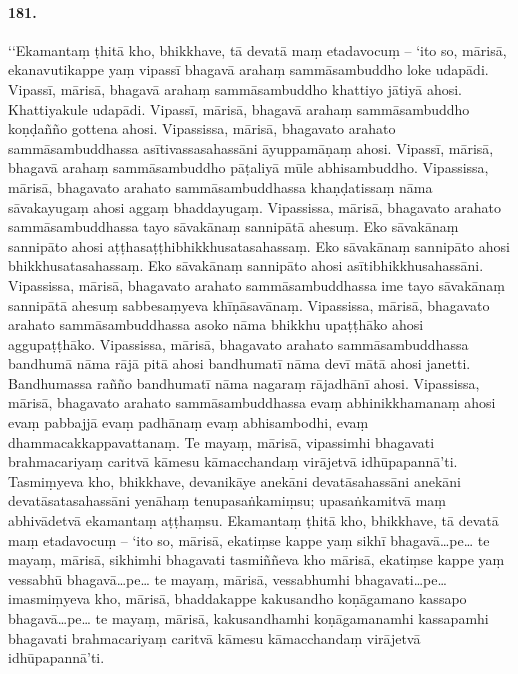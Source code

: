 \paragraph{181.} ‘‘Ekamantaṃ ṭhitā kho, bhikkhave, tā devatā maṃ etadavocuṃ – ‘ito so, mārisā, ekanavutikappe yaṃ vipassī bhagavā arahaṃ sammāsambuddho loke udapādi. Vipassī, mārisā, bhagavā arahaṃ sammāsambuddho khattiyo jātiyā ahosi. Khattiyakule udapādi. Vipassī, mārisā, bhagavā arahaṃ sammāsambuddho koṇḍañño gottena ahosi. Vipassissa, mārisā, bhagavato arahato sammāsambuddhassa asītivassasahassāni āyuppamāṇaṃ ahosi. Vipassī, mārisā, bhagavā arahaṃ sammāsambuddho pāṭaliyā mūle abhisambuddho. Vipassissa, mārisā, bhagavato arahato sammāsambuddhassa khaṇḍatissaṃ nāma sāvakayugaṃ ahosi aggaṃ bhaddayugaṃ. Vipassissa, mārisā, bhagavato arahato sammāsambuddhassa tayo sāvakānaṃ sannipātā ahesuṃ. Eko sāvakānaṃ sannipāto ahosi aṭṭhasaṭṭhibhikkhusatasahassaṃ. Eko sāvakānaṃ sannipāto ahosi bhikkhusatasahassaṃ. Eko sāvakānaṃ sannipāto ahosi asītibhikkhusahassāni. Vipassissa, mārisā, bhagavato arahato sammāsambuddhassa ime tayo sāvakānaṃ sannipātā ahesuṃ sabbesaṃyeva khīṇāsavānaṃ. Vipassissa, mārisā, bhagavato arahato sammāsambuddhassa asoko nāma bhikkhu upaṭṭhāko ahosi aggupaṭṭhāko. Vipassissa, mārisā, bhagavato arahato sammāsambuddhassa bandhumā nāma rājā pitā ahosi bandhumatī nāma devī mātā ahosi janetti. Bandhumassa rañño bandhumatī nāma nagaraṃ rājadhānī ahosi. Vipassissa, mārisā, bhagavato arahato sammāsambuddhassa evaṃ abhinikkhamanaṃ ahosi evaṃ pabbajjā evaṃ padhānaṃ evaṃ abhisambodhi, evaṃ dhammacakkappavattanaṃ. Te mayaṃ, mārisā, vipassimhi bhagavati brahmacariyaṃ caritvā kāmesu kāmacchandaṃ virājetvā idhūpapannā’ti. Tasmiṃyeva kho, bhikkhave, devanikāye anekāni devatāsahassāni anekāni devatāsatasahassāni yenāhaṃ tenupasaṅkamiṃsu; upasaṅkamitvā maṃ abhivādetvā ekamantaṃ aṭṭhaṃsu. Ekamantaṃ ṭhitā kho, bhikkhave, tā devatā maṃ etadavocuṃ – ‘ito so, mārisā, ekatiṃse kappe yaṃ sikhī bhagavā…pe… te mayaṃ, mārisā, sikhimhi bhagavati tasmiññeva kho mārisā, ekatiṃse kappe yaṃ vessabhū bhagavā…pe… te mayaṃ, mārisā, vessabhumhi bhagavati…pe… imasmiṃyeva kho, mārisā, bhaddakappe kakusandho koṇāgamano kassapo bhagavā…pe… te mayaṃ, mārisā, kakusandhamhi koṇāgamanamhi kassapamhi bhagavati brahmacariyaṃ caritvā kāmesu kāmacchandaṃ virājetvā idhūpapannā’ti.

